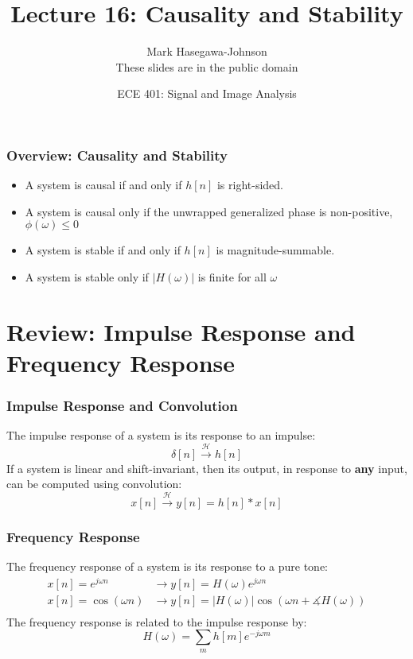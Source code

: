 \documentclass{beamer}
\title{Lecture 16: Causality and Stability}
\author{Mark Hasegawa-Johnson\\These slides are in the public domain}
\date{ECE 401: Signal and Image Analysis}
\begin{document}
\begin{frame}
  \maketitle
\end{frame}

\begin{frame}
  \frametitle{Overview: Causality and Stability}

  \begin{itemize}
  \item A system is causal if and only if $h[n]$ is right-sided.
  \item A system is causal only if the unwrapped generalized phase is non-positive,
    $\phi(\omega)\le 0$
  \item A system is stable if and only if $h[n]$ is
    magnitude-summable.
  \item A system is stable only if $|H(\omega)|$ is finite for all $\omega$
  \end{itemize}
\end{frame}

\begin{frame}
  \tableofcontents
\end{frame}

\section[Review]{Review: Impulse Response and Frequency Response}
\setcounter{subsection}{1}

\begin{frame}
  \frametitle{Impulse Response and Convolution}

  The impulse response of a system is its response to an impulse:
  \begin{displaymath}
    \delta[n] \stackrel{\mathcal H}{\longrightarrow} h[n]
  \end{displaymath}
  If a system is linear and shift-invariant, then its output, in
  response to {\bf any} input, can be computed  using convolution:
  \begin{displaymath}
    x[n] \stackrel{\mathcal H}{\longrightarrow} y[n]=h[n]\ast x[n]
  \end{displaymath}
\end{frame}

\begin{frame}
  \frametitle{Frequency Response}

  The frequency response of a system is its response to a pure tone:
  \begin{align*}
    x[n]=e^{j\omega n} &\rightarrow y[n]=H(\omega)e^{j\omega n}\\
    x[n]=\cos\left(\omega n\right)
    &\rightarrow y[n]=|H(\omega)|\cos\left(\omega n+\measuredangle H(\omega)\right)\\
  \end{align*}
  The frequency response is related to the impulse response by:
  \[
  H(\omega) = \sum_m h[m]e^{-j\omega m}
  \]
\end{frame}  
        
\end{document}
